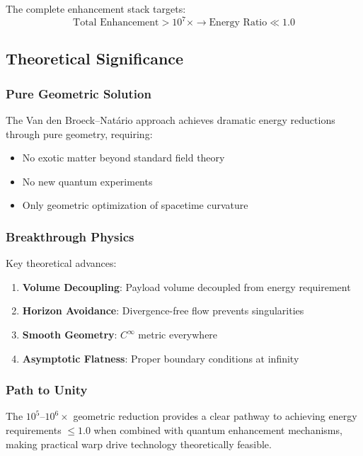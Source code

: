 The complete enhancement stack targets:
\begin{equation}
\text{Total Enhancement} > 10^7\times \rightarrow \text{Energy Ratio} \ll 1.0
\end{equation}

\subsection{Theoretical Significance}

\subsubsection{Pure Geometric Solution}

The Van den Broeck–Natário approach achieves dramatic energy reductions through pure geometry, requiring:
\begin{itemize}
\item No exotic matter beyond standard field theory
\item No new quantum experiments
\item Only geometric optimization of spacetime curvature
\end{itemize}

\subsubsection{Breakthrough Physics}

Key theoretical advances:
\begin{enumerate}
\item \textbf{Volume Decoupling}: Payload volume decoupled from energy requirement
\item \textbf{Horizon Avoidance}: Divergence-free flow prevents singularities
\item \textbf{Smooth Geometry}: $C^{\infty}$ metric everywhere
\item \textbf{Asymptotic Flatness}: Proper boundary conditions at infinity
\end{enumerate}

\subsubsection{Path to Unity}

The $10^5$--$10^6\times$ geometric reduction provides a clear pathway to achieving energy requirements $\leq 1.0$ when combined with quantum enhancement mechanisms, making practical warp drive technology theoretically feasible.

